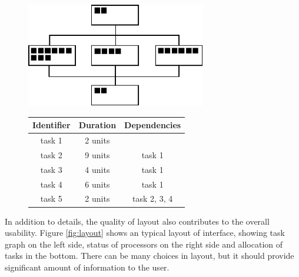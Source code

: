 \documentclass[a4paper,11pt]{article}
\begin{document}
\begin{figure}
\begin{minipage}{\textwidth}
    \vspace{1em}
    \hfill
    \begin{minipage}[b]{0.4\textwidth}
        \centering
        \includegraphics[width=0.7\textwidth]{repr.pdf}
        \vspace{0.5em}
        \label{fig:repr}
    \end{minipage}
    \hfill
    \begin{minipage}[b]{0.49\textwidth}
        \center
        \begin{tabular}{ccc}\hline
            Identifier & Duration & Dependencies \\ \hline
            task 1 & 2 units &  \\
            task 2 & 9 units & task 1 \\
            task 3 & 4 units & task 1 \\
            task 4 & 6 units & task 1\\
            task 5 & 2 units & task 2, 3, 4 \\ \hline
        \end{tabular}
        \label{tab:repr}
    \end{minipage}
    \hfill
    \vspace{1em}
\end{minipage}
\end{figure}

In addition to details, the quality of layout also contributes to the overall usability. Figure \ref{fig:layout} shows an typical layout of interface, showing task graph on the left side, status of processors on the right side and allocation of tasks in the bottom. There can be many choices in layout, but it should provide significant amount of information to the user.
\end{document}
